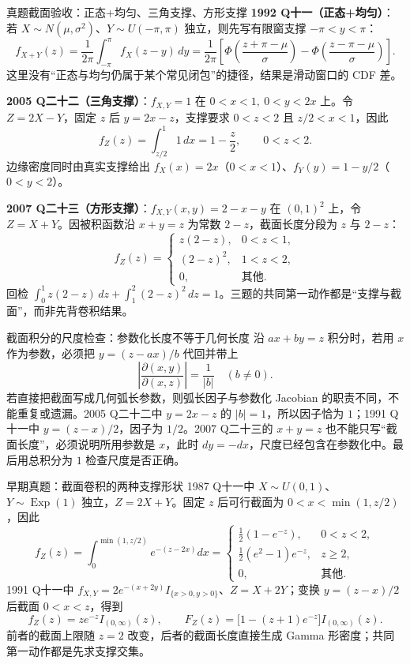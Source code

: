 \documentclass[11pt,a4paper]{ctexart}
\begin{document}
\begin{examplebox}{真题截面验收：正态+均匀、三角支撑、方形支撑}
\textbf{1992 Q十一（正态+均匀）}：若 $X\sim N(\mu,\sigma^2)$、$Y\sim U(-\pi,\pi)$ 独立，则先写有限窗支撑 $-\pi<y<\pi$：
\[
f_{X+Y}(z)=\frac1{2\pi}\int_{-\pi}^{\pi}f_X(z-y)\,dy
=\frac1{2\pi}\left[\Phi\!\left(\frac{z+\pi-\mu}{\sigma}\right)-\Phi\!\left(\frac{z-\pi-\mu}{\sigma}\right)\right].
\]
这里没有“正态与均匀仍属于某个常见闭包”的捷径，结果是滑动窗口的 CDF 差。

\textbf{2005 Q二十二（三角支撑）}：$f_{X,Y}=1$ 在 $0<x<1,\ 0<y<2x$ 上。令 $Z=2X-Y$，固定 $z$ 后 $y=2x-z$，支撑要求 $0<z<2$ 且 $z/2<x<1$，因此
\[
f_Z(z)=\int_{z/2}^{1}1\,dx=1-\frac z2,\qquad0<z<2.
\]
边缘密度同时由真实支撑给出 $f_X(x)=2x$（$0<x<1$）、$f_Y(y)=1-y/2$（$0<y<2$）。

\textbf{2007 Q二十三（方形支撑）}：$f_{X,Y}(x,y)=2-x-y$ 在 $(0,1)^2$ 上，令 $Z=X+Y$。因被积函数沿 $x+y=z$ 为常数 $2-z$，截面长度分段为 $z$ 与 $2-z$：
\[
f_Z(z)=\begin{cases}z(2-z),&0<z<1,\\(2-z)^2,&1<z<2,\\0,&\text{其他}.\end{cases}
\]
回检 $\int_0^1z(2-z)\,dz+\int_1^2(2-z)^2\,dz=1$。三题的共同第一动作都是“支撑与截面”，而非先背卷积结果。
\end{examplebox}

\begin{methodbox}{截面积分的尺度检查：参数化长度不等于几何长度}
沿 $ax+by=z$ 积分时，若用 $x$ 作为参数，必须把 $y=(z-ax)/b$ 代回并带上
\[
\left\lvert\frac{\partial(x,y)}{\partial(x,z)}\right\rvert=\frac1{\lvert b\rvert}
\quad(b\ne0).
\]
若直接把截面写成几何弧长参数，则弧长因子与参数化 Jacobian 的职责不同，不能重复或遗漏。2005 Q二十二中 $y=2x-z$ 的 $\lvert b\rvert=1$，所以因子恰为 $1$；1991 Q十一中 $y=(z-x)/2$，因子为 $1/2$。2007 Q二十三的 $x+y=z$ 也不能只写“截面长度”，必须说明所用参数是 $x$，此时 $dy=-dx$，尺度已经包含在参数化中。最后用总积分为 $1$ 检查尺度是否正确。
\end{methodbox}

\begin{examplebox}{早期真题：截面卷积的两种支撑形状}
1987 Q十一中 $X\sim U(0,1)$、$Y\sim\operatorname{Exp}(1)$ 独立，$Z=2X+Y$。固定 $z$ 后可行截面为 $0<x<\min(1,z/2)$，因此
\[
f_Z(z)=\int_0^{\min(1,z/2)}e^{-(z-2x)}dx
=\begin{cases}
\frac12(1-e^{-z}),&0<z<2,\\
\frac12(e^2-1)e^{-z},&z\ge2,\\
0,&\text{其他}.
\end{cases}
\]
1991 Q十一中 $f_{X,Y}=2e^{-(x+2y)}I_{\{x>0,y>0\}}$、$Z=X+2Y$；变换 $y=(z-x)/2$ 后截面 $0<x<z$，得到
\[
f_Z(z)=ze^{-z}I_{(0,\infty)}(z),\qquad F_Z(z)=\bigl[1-(z+1)e^{-z}\bigr]I_{(0,\infty)}(z).
\]
前者的截面上限随 $z=2$ 改变，后者的截面长度直接生成 Gamma 形密度；共同第一动作都是先求支撑交集。
\end{examplebox}
\end{document}
